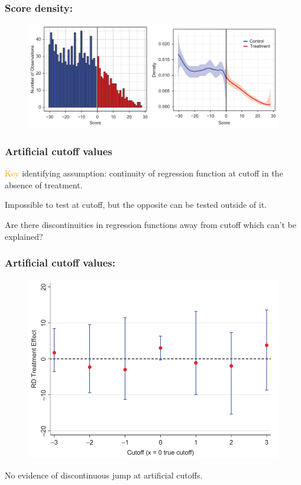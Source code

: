 \documentclass[12pt,english,dvipsnames,aspectratio=169,handout]{beamer}\usepackage[]{graphicx}\usepackage[]{xcolor}
\begin{document}
\begin{frame}
\frametitle{Score density: }

\begin{figure}
\centering
\includegraphics[scale=0.35]{../04-figures/07/14.PNG}
\caption{\cite{cattaneo_practical_2019}}
\end{figure}

\end{frame}


\begin{frame}
\frametitle{Artificial cutoff values}
\textcolor{orange}{Key} identifying assumption: continuity of regression function at cutoff in the absence of treatment.\bigskip
\pause

Impossible to test at cutoff, but the opposite can be tested outside of it.\bigskip

Are there discontinuities in regression functions away from cutoff which can't be explained?

\end{frame}


\begin{frame}
\frametitle{Artificial cutoff values: }

\begin{figure}
\centering
\includegraphics[scale=0.3]{../04-figures/07/15.PNG}
\caption{\cite{cattaneo_practical_2019}}
\end{figure}

No evidence of discontinuous jump at artificial cutoffs.

\end{frame}
\end{document}
